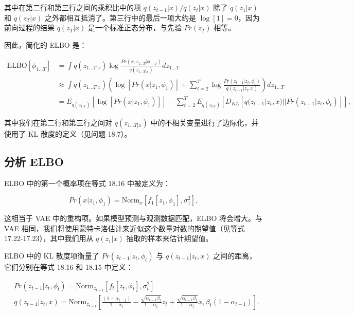 其中在第二行和第三行之间的乘积比中的项 \(q(z_{t-1}|x)/q(z_t|x)\) 除了 \(q(z_1|x)\) 和 \(q(z_T|x)\) 之外都相互抵消了。第三行中的最后一项大约是 \(\log[1] = 0\)，因为前向过程的结果 \(q(z_T|x)\) 是一个标准正态分布，与先验 \(Pr(z_T)\) 相等。

因此，简化的 ELBO 是：


\begin{align}
\text{ELBO}[\phi_{1...T}] &= \int q(z_{1...T|x}) \log \frac{Pr(x, z_{1...T}|\phi_{1...T})}{q(z_{1...T|x})} dz_{1...T} \\
&\approx \int q(z_{1...T|x}) \left( \log [Pr(x|z_1, \phi_1)] + \sum_{t=2}^T \log \frac{Pr(z_{t-1}|z_t, \phi_t)}{q(z_{t-1}|z_t, x)} \right) dz_{1...T} \\
&= E_{q(z_{1|x})} \left[ \log [Pr(x|z_1, \phi_1)] \right] - \sum_{t=2}^T E_{q(z_{t|x})} \left[ D_{KL} \left[ q(z_{t-1}|z_t, x)||Pr(z_{t-1}|z_t, \phi_t) \right] \right],
\end{align}


其中我们在第二行和第三行之间对 \(q(z_{1...T|x})\) 中的不相关变量进行了边际化，并使用了 KL 散度的定义（见问题 18.7）。

\subsection{分析 ELBO}
ELBO 中的第一个概率项在等式 18.16 中被定义为：

\begin{equation}
Pr(x|z_1, \phi_1) = \text{Norm}_x \left[ f_1[z_1, \phi_1], \sigma^2_{1} \right], 
\end{equation}

这相当于 VAE 中的重构项。如果模型预测与观测数据匹配，ELBO 将会增大。与 VAE 相同，我们将使用蒙特卡洛估计来近似这个数量对数的期望值（见等式 17.22-17.23），其中我们用从 \(q(z_1|x)\) 抽取的样本来估计期望值。

ELBO 中的 KL 散度项衡量了 \(Pr(z_{t-1}|z_t, \phi_t)\) 与 \(q(z_{t-1}|z_t, x)\) 之间的距离，它们分别在等式 18.16 和 18.15 中定义：


\begin{align}
&Pr(z_{t-1}|z_t, \phi_t) = \text{Norm}_{z_{t-1}} \left[ f_t[z_t, \phi_t], \sigma^2_t \right] \\
&q(z_{t-1}|z_t, x) = \text{Norm}_{z_{t-1}} \left[ \frac{(1 - \alpha_{t-1})}{1 - \alpha_t} - \frac{\sqrt{\alpha_{t-1}\beta_t}}{1 - \alpha_t} z_t + \frac{\sqrt{\alpha_{t-1}\beta_t}}{1 - \alpha_t} x, \beta_t(1 - \alpha_{t-1}) \right]. 
\end{align} 


